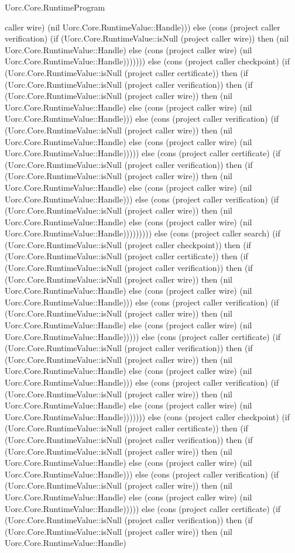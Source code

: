 \begin{lexlean}{Uorc.Core.RuntimeProgram}
\begin{semanticmodule}
{caller wire) (nil Uorc.Core.RuntimeValue::Handle))) else (cons (project caller verification) (if (Uorc.Core.RuntimeValue::isNull (project caller wire)) then (nil Uorc.Core.RuntimeValue::Handle) else (cons (project caller wire) (nil Uorc.Core.RuntimeValue::Handle))))))) else (cons (project caller checkpoint) (if (Uorc.Core.RuntimeValue::isNull (project caller certificate)) then (if (Uorc.Core.RuntimeValue::isNull (project caller verification)) then (if (Uorc.Core.RuntimeValue::isNull (project caller wire)) then (nil Uorc.Core.RuntimeValue::Handle) else (cons (project caller wire) (nil Uorc.Core.RuntimeValue::Handle))) else (cons (project caller verification) (if (Uorc.Core.RuntimeValue::isNull (project caller wire)) then (nil Uorc.Core.RuntimeValue::Handle) else (cons (project caller wire) (nil Uorc.Core.RuntimeValue::Handle))))) else (cons (project caller certificate) (if (Uorc.Core.RuntimeValue::isNull (project caller verification)) then (if (Uorc.Core.RuntimeValue::isNull (project caller wire)) then (nil Uorc.Core.RuntimeValue::Handle) else (cons (project caller wire) (nil Uorc.Core.RuntimeValue::Handle))) else (cons (project caller verification) (if (Uorc.Core.RuntimeValue::isNull (project caller wire)) then (nil Uorc.Core.RuntimeValue::Handle) else (cons (project caller wire) (nil Uorc.Core.RuntimeValue::Handle))))))))) else (cons (project caller search) (if (Uorc.Core.RuntimeValue::isNull (project caller checkpoint)) then (if (Uorc.Core.RuntimeValue::isNull (project caller certificate)) then (if (Uorc.Core.RuntimeValue::isNull (project caller verification)) then (if (Uorc.Core.RuntimeValue::isNull (project caller wire)) then (nil Uorc.Core.RuntimeValue::Handle) else (cons (project caller wire) (nil Uorc.Core.RuntimeValue::Handle))) else (cons (project caller verification) (if (Uorc.Core.RuntimeValue::isNull (project caller wire)) then (nil Uorc.Core.RuntimeValue::Handle) else (cons (project caller wire) (nil Uorc.Core.RuntimeValue::Handle))))) else (cons (project caller certificate) (if (Uorc.Core.RuntimeValue::isNull (project caller verification)) then (if (Uorc.Core.RuntimeValue::isNull (project caller wire)) then (nil Uorc.Core.RuntimeValue::Handle) else (cons (project caller wire) (nil Uorc.Core.RuntimeValue::Handle))) else (cons (project caller verification) (if (Uorc.Core.RuntimeValue::isNull (project caller wire)) then (nil Uorc.Core.RuntimeValue::Handle) else (cons (project caller wire) (nil Uorc.Core.RuntimeValue::Handle))))))) else (cons (project caller checkpoint) (if (Uorc.Core.RuntimeValue::isNull (project caller certificate)) then (if (Uorc.Core.RuntimeValue::isNull (project caller verification)) then (if (Uorc.Core.RuntimeValue::isNull (project caller wire)) then (nil Uorc.Core.RuntimeValue::Handle) else (cons (project caller wire) (nil Uorc.Core.RuntimeValue::Handle))) else (cons (project caller verification) (if (Uorc.Core.RuntimeValue::isNull (project caller wire)) then (nil Uorc.Core.RuntimeValue::Handle) else (cons (project caller wire) (nil Uorc.Core.RuntimeValue::Handle))))) else (cons (project caller certificate) (if (Uorc.Core.RuntimeValue::isNull (project caller verification)) then (if (Uorc.Core.RuntimeValue::isNull (project caller wire)) then (nil Uorc.Core.RuntimeValue::Handle) }
\end{semanticmodule}
\end{lexlean}
